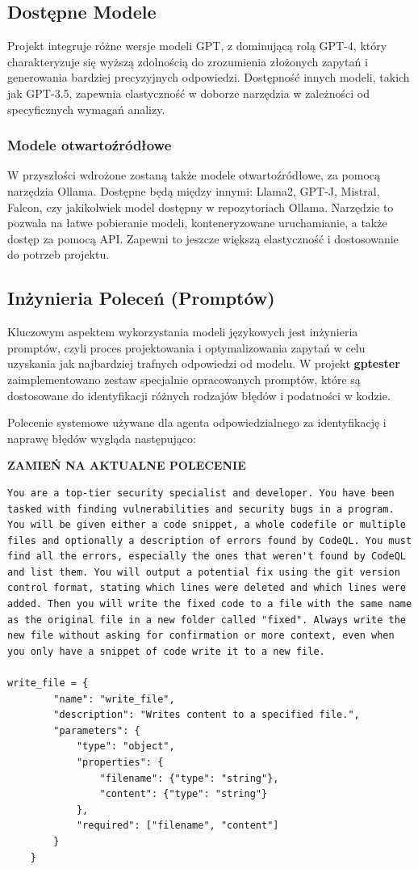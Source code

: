 \subsection{Dostępne Modele}
Projekt integruje różne wersje modeli GPT, z dominującą rolą GPT-4, który charakteryzuje się wyższą zdolnością do zrozumienia złożonych zapytań i generowania bardziej precyzyjnych odpowiedzi. Dostępność innych modeli, takich jak GPT-3.5, zapewnia elastyczność w doborze narzędzia w zależności od specyficznych wymagań analizy. 

\subsubsection{Modele otwartoźródłowe}
W przyszłości wdrożone zostaną także modele otwartoźródłowe, za pomocą narzędzia Ollama. Dostępne będą między innymi: Llama2, GPT-J, Mistral, Falcon, czy jakikolwiek model dostępny w repozytoriach Ollama. Narzędzie to pozwala na łatwe pobieranie modeli, konteneryzowane uruchamianie, a także dostęp za pomocą API. Zapewni to jeszcze większą elastyczność i dostosowanie do potrzeb projektu.

\subsection{Inżynieria Poleceń (Promptów)}
Kluczowym aspektem wykorzystania modeli językowych jest inżynieria promptów, czyli proces projektowania i optymalizowania zapytań w celu uzyskania jak najbardziej trafnych odpowiedzi od modelu. W projekt \textbf{gptester} zaimplementowano zestaw specjalnie opracowanych promptów, które są dostosowane do identyfikacji różnych rodzajów błędów i podatności w kodzie.

Polecenie systemowe używane dla agenta odpowiedzialnego za identyfikację i naprawę błędów wygląda następująco:

\textbf{ZAMIEŃ NA AKTUALNE POLECENIE}
\begin{verbatim}
You are a top-tier security specialist and developer. You have been 
tasked with finding vulnerabilities and security bugs in a program. 
You will be given either a code snippet, a whole codefile or multiple 
files and optionally a description of errors found by CodeQL. You must 
find all the errors, especially the ones that weren't found by CodeQL 
and list them. You will output a potential fix using the git version 
control format, stating which lines were deleted and which lines were 
added. Then you will write the fixed code to a file with the same name 
as the original file in a new folder called "fixed". Always write the 
new file without asking for confirmation or more context, even when 
you only have a snippet of code write it to a new file.

write_file = {
        "name": "write_file",
        "description": "Writes content to a specified file.",
        "parameters": {
            "type": "object",
            "properties": {
                "filename": {"type": "string"},
                "content": {"type": "string"}
            },
            "required": ["filename", "content"]
        }
    }

\end{verbatim}


